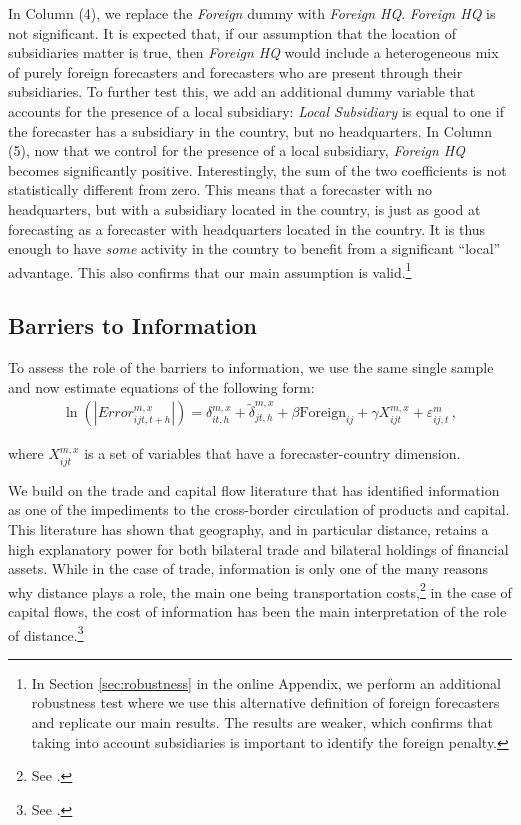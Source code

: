 In Column (4), we replace the \textit{Foreign} dummy with \textit{Foreign HQ}. \textit{Foreign HQ} is not significant. It is expected that, if our assumption that the location of subsidiaries matter is true, then \textit{Foreign HQ} would include a heterogeneous mix of purely foreign forecasters and forecasters who are present through their subsidiaries. To further test this, we add an additional dummy variable that accounts for the presence of a local subsidiary: \textit{Local Subsidiary} is equal to one if the forecaster has a subsidiary in the country, but no headquarters. In Column (5), now that we control for the presence of a local subsidiary, \textit{Foreign HQ} becomes significantly positive. Interestingly, the sum of the two coefficients is not statistically different from zero. This means that a forecaster with no headquarters, but with a subsidiary located in the country, is just as good at forecasting as a forecaster with headquarters located in the country. It is thus enough to have \emph{some} activity in the country to benefit from a significant ``local'' advantage. This also confirms that our main assumption is valid.\footnote{In Section \ref{sec:robustness} in the online Appendix, we perform an additional robustness test where we use this alternative definition of foreign forecasters and replicate our main results. The results are weaker, which confirms that taking into account subsidiaries is important to identify the foreign penalty.}

\subsection{Barriers to Information}


To assess the role of the barriers to information, we use the same single sample and now estimate equations of the following form:
\begin{align}
	\ln(|Error_{ijt,t+h}^{m,x}|)= \delta_{it,h}^{m,x} +\tilde\delta_{jt,h}^{m,x} +  \beta \text{Foreign}_{ij} +\gamma X_{ijt}^{m,x}+ \varepsilon_{ij,t}^m  \,, \label{eq:geography}
\end{align}

where $X_{ijt}^{m,x}$ is a set of variables that have a forecaster-country dimension.

We build on the trade and capital flow literature that has identified information as one of the impediments to the cross-border circulation of products and capital. This literature has shown that geography, and in particular distance, retains a high explanatory power for both bilateral trade and bilateral holdings of financial assets. While in the case of trade, information is only one of the many reasons why distance plays a role, the main one being transportation costs,\footnote{See \citet{AndersonvanWincoop2004,HeadMayer2013,Allen2014}.} in the case  of capital flows,  the cost of information has been the main interpretation of the role of distance.\footnote{See \citet{Ghosh2000,GrinblattKeloharju2001,DiGiovanni2005,PortesRey2005}.}


